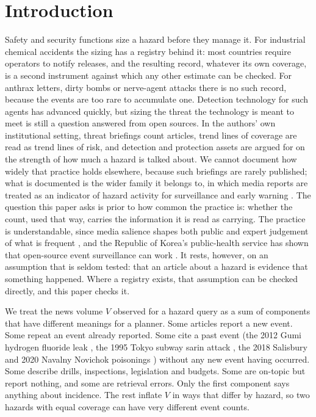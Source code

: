 \documentclass[1p,times]{elsarticle}
\begin{document}
\section{Introduction}
\label{sec:intro}

Safety and security functions size a hazard before they manage it. For industrial chemical accidents the sizing has a registry behind it: most countries require operators to notify releases, and the resulting record, whatever its own coverage, is a second instrument against which any other estimate can be checked. For anthrax letters, dirty bombs or nerve-agent attacks there is no such record, because the events are too rare to accumulate one. Detection technology for such agents has advanced quickly, but sizing the threat the technology is meant to meet is still a question answered from open sources. In the authors' own institutional setting, threat briefings count articles, trend lines of coverage are read as trend lines of risk, and detection and protection assets are argued for on the strength of how much a hazard is talked about. We cannot document how widely that practice holds elsewhere, because such briefings are rarely published; what is documented is the wider family it belongs to, in which media reports are treated as an indicator of hazard activity for surveillance and early warning \cite{hartley2010,barboza2014,freifeld2008,brownstein2009,abbood2020}. The question this paper asks is prior to how common the practice is: whether the count, used that way, carries the information it is read as carrying. The practice is understandable, since media salience shapes both public and expert judgement of what is frequent \cite{mccombs1972,tversky1973,combs1979,slovic1987}, and the Republic of Korea's public-health service has shown that open-source event surveillance can work \cite{kim2025ebs}. It rests, however, on an assumption that is seldom tested: that an article about a hazard is evidence that something happened. Where a registry exists, that assumption can be checked directly, and this paper checks it.

We treat the news volume $V$ observed for a hazard query as a sum of components that have different meanings for a planner. Some articles report a new event. Some repeat an event already reported. Some cite a past event (the 2012 Gumi hydrogen fluoride leak \cite{kim2012gumi,koo2017gumi}, the 1995 Tokyo subway sarin attack \cite{okumura1996}, the 2018 Salisbury and 2020 Navalny Novichok poisonings \cite{chai2018}) without any new event having occurred. Some describe drills, inspections, legislation and budgets. Some are on-topic but report nothing, and some are retrieval errors. Only the first component says anything about incidence. The rest inflate $V$ in ways that differ by hazard, so two hazards with equal coverage can have very different event counts.
\end{document}
